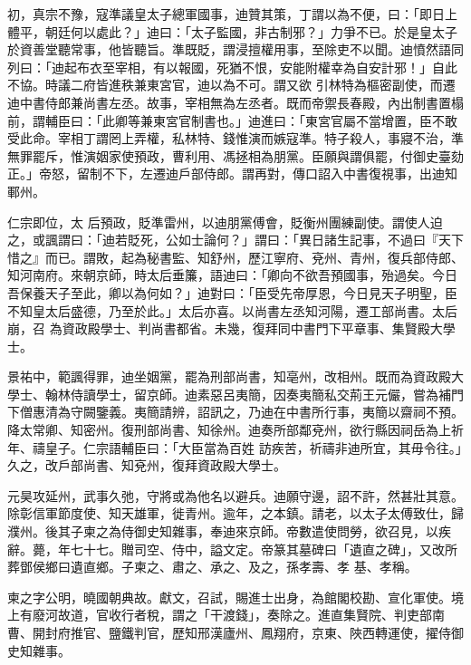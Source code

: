 \begin{pinyinscope}
 初，真宗不豫，寇準議皇太子總軍國事，迪贊其策，丁謂以為不便，曰：「即日上體平，朝廷何以處此？」迪曰：「太子監國，非古制邪？」力爭不已。於是皇太子於資善堂聽常事，他皆聽旨。準既貶，謂浸擅權用事，至除吏不以聞。迪憤然語同列曰：「迪起布衣至宰相，有以報國，死猶不恨，安能附權幸為自安計邪！」自此不協。時議二府皆進秩兼東宮官，迪以為不可。謂又欲
 引林特為樞密副使，而遷迪中書侍郎兼尚書左丞。故事，宰相無為左丞者。既而帝禦長春殿，內出制書置榻前，謂輔臣曰：「此卿等兼東宮官制書也。」迪進曰：「東宮官屬不當增置，臣不敢受此命。宰相丁謂罔上弄權，私林特、錢惟演而嫉寇準。特子殺人，事寢不治，準無罪罷斥，惟演姻家使預政，曹利用、馮拯相為朋黨。臣願與謂俱罷，付御史臺劾正。」帝怒，留制不下，左遷迪戶部侍郎。謂再對，傳口詔入中書復視事，出迪知鄆州。



 仁宗即位，太
 后預政，貶準雷州，以迪朋黨傅會，貶衡州團練副使。謂使人迫之，或諷謂曰：「迪若貶死，公如士論何？」謂曰：「異日諸生記事，不過曰『天下惜之』而已。謂敗，起為秘書監、知舒州，歷江寧府、兗州、青州，復兵部侍郎、知河南府。來朝京師，時太后垂簾，語迪曰：「卿向不欲吾預國事，殆過矣。今日吾保養天子至此，卿以為何如？」迪對曰：「臣受先帝厚恩，今日見天子明聖，臣不知皇太后盛德，乃至於此。」太后亦喜。以尚書左丞知河陽，遷工部尚書。太后崩，召
 為資政殿學士、判尚書都省。未幾，復拜同中書門下平章事、集賢殿大學士。



 景祐中，範諷得罪，迪坐姻黨，罷為刑部尚書，知亳州，改相州。既而為資政殿大學士、翰林侍讀學士，留京師。迪素惡呂夷簡，因奏夷簡私交荊王元儼，嘗為補門下僧惠清為守闕鑒義。夷簡請辨，詔訊之，乃迪在中書所行事，夷簡以齋祠不預。降太常卿、知密州。復刑部尚書、知徐州。迪奏所部鄰兗州，欲行縣因祠岳為上祈年、禱皇子。仁宗語輔臣曰：「大臣當為百姓
 訪疾苦，祈禱非迪所宜，其毋令往。」久之，改戶部尚書、知兗州，復拜資政殿大學士。



 元昊攻延州，武事久弛，守將或為他名以避兵。迪願守邊，詔不許，然甚壯其意。除彰信軍節度使、知天雄軍，徙青州。逾年，之本鎮。請老，以太子太傅致仕，歸濮州。後其子柬之為侍御史知雜事，奉迪來京師。帝數遣使問勞，欲召見，以疾辭。薨，年七十七。贈司空、侍中，謚文定。帝篆其墓碑曰「遺直之碑」，又改所葬鄧侯鄉曰遺直鄉。子柬之、肅之、承之、及之，孫孝壽、孝
 基、孝稱。



 柬之字公明，曉國朝典故。獻文，召試，賜進士出身，為館閣校勘、宣化軍使。境上有廢河故道，官收行者稅，謂之「干渡錢」，奏除之。進直集賢院、判吏部南曹、開封府推官、鹽鐵判官，歷知邢漢廬州、鳳翔府，京東、陜西轉運使，擢侍御史知雜事。




\end{pinyinscope}
